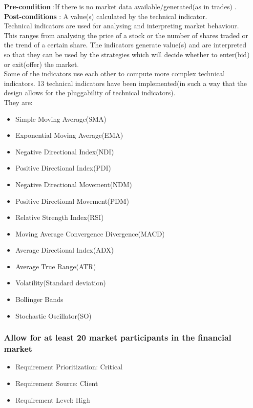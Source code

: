 \documentclass[12pt]{article}
\begin{document}
				\textbf{Pre-condition} :If there is no market data available/generated(as in trades) .\\
				\textbf{Post-conditions} : A value(s) calculated by the technical indicator.\\ 
						
				Technical indicators are used for analysing and interpreting market behaviour. This ranges from analysing the price of a stock or the number of shares traded or the trend of a certain share. The indicators generate value(s) and are interpreted so that they can be used by the strategies which will decide whether to enter(bid) or exit(offer) the market.\\
				Some of the indicators use each other to compute more complex technical indicators. 13 technical indicators have been implemented(in such a way that the design allows for the pluggability of technical indicators).\\
				They are:
				\begin{itemize}
					\item Simple Moving Average(SMA)
					\item Exponential Moving Average(EMA)
					\item Negative Directional Index(NDI) 
					\item Positive Directional Index(PDI)
					\item Negative Directional Movement(NDM)
					\item Positive Directional Movement(PDM)
					\item Relative Strength Index(RSI)
					\item Moving Average Convergence Divergence(MACD)
					\item Average Directional Index(ADX)
					\item Average True Range(ATR)
					\item Volatility(Standard deviation)
					\item Bollinger Bands
					\item Stochastic Oscillator(SO)	
				\end{itemize} 								
				
				\subsubsection{Allow for at least 20 market participants in the financial market}
				\begin{itemize}
					\item Requirement Prioritization: Critical
					\item Requirement Source: Client
					\item Requirement Level: High 	
				\end{itemize}
				
\end{document}
